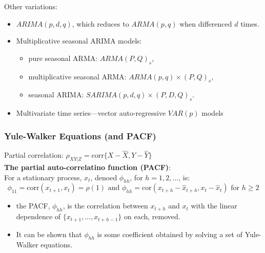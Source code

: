 \documentclass[11pt]{article}
\newcommand{\noi}{\noindent}
\begin{document}
\noi Other variations:
\begin{itemize}
    \item $ARIMA(p, d, q)$, which reduces to $ARMA(p, q)$ when differenced $d$ times.
    \item Multiplicative seasonal ARIMA models:
        \begin{itemize}
            \item pure seasonal ARMA: $ARMA(P, Q)_s$,
            \item multiplicative seasonal ARMA: $ARMA(p,q) \times (P,Q)_s$,
            \item seasonal ARIMA: $SARIMA(p, d, q) \times (P, D, Q)_s$.
        \end{itemize}
    \item Multivariate time series---vector auto-regressive $VAR(p)$ models 
\end{itemize}

\subsubsection{Yule-Walker Equations (and PACF)}
\noi Partial correlation: $ \rho_{XY|Z} = \text{corr}\{X - \hat X, Y - \hat Y\}$ \\

\noi \textbf{The partial auto-correlatino function (PACF)}: \\
\noi For a stationary process, $x_t$, denoed $\phi_{hh}$, for $h=1,2,...$, is:
$$\phi_{11} = \text{corr}(x_{t+1}, x_t) = \rho(1) \text{ and } \phi_{hh} = \text{cor}(x_{t+h} - \hat{x}_{t+h}, x_t - \hat{x}_t) \text{ for } h \geq 2$$
\begin{itemize}
    \item the PACF, $\phi_{hh}$, is the correlation between $x_{t+h}$ and $x_t$ with the linear dependence of $\{x_{t+1},...,x_{t+h-1}\}$ on each, removed.
    \item It can be shown that $\phi_{hh}$ is some coefficient obtained by solving a set of Yule-Walker equations.
\end{itemize} \phantom{i}
\end{document}
